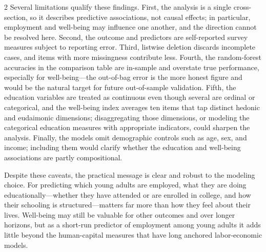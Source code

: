 \documentclass[
  11pt,
]{article}
\begin{document}
\begin{multicols}{2}
Several limitations qualify these findings. First, the analysis is a single cross-section, so it describes predictive associations, not causal effects; in particular, employment and well-being may influence one another, and the direction cannot be resolved here. Second, the outcome and predictors are self-reported survey measures subject to reporting error. Third, listwise deletion discards incomplete cases, and items with more missingness contribute less. Fourth, the random-forest accuracies in the comparison table are in-sample and overstate true performance, especially for well-being---the out-of-bag error is the more honest figure and would be the natural target for future out-of-sample validation. Fifth, the education variables are treated as continuous even though several are ordinal or categorical, and the well-being index averages ten items that tap distinct hedonic and eudaimonic dimensions; disaggregating those dimensions, or modeling the categorical education measures with appropriate indicators, could sharpen the analysis. Finally, the models omit demographic controls such as age, sex, and income; including them would clarify whether the education and well-being associations are partly compositional.

Despite these caveats, the practical message is clear and robust to the modeling choice. For predicting which young adults are employed, what they are doing educationally---whether they have attended or are enrolled in college, and how their schooling is structured---matters far more than how they feel about their lives. Well-being may still be valuable for other outcomes and over longer horizons, but as a short-run predictor of employment among young adults it adds little beyond the human-capital measures that have long anchored labor-economic models.

\end{multicols}
\end{document}
